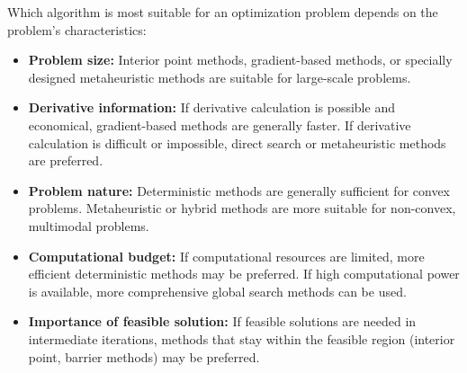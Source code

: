 \begin{tcolorbox}[title=Optimization Algorithm Selection]
Which algorithm is most suitable for an optimization problem depends on the problem's characteristics:

\begin{itemize}
    \item \textbf{Problem size:} Interior point methods, gradient-based methods, or specially designed metaheuristic methods are suitable for large-scale problems.
    
    \item \textbf{Derivative information:} If derivative calculation is possible and economical, gradient-based methods are generally faster. If derivative calculation is difficult or impossible, direct search or metaheuristic methods are preferred.
    
    \item \textbf{Problem nature:} Deterministic methods are generally sufficient for convex problems. Metaheuristic or hybrid methods are more suitable for non-convex, multimodal problems.
    
    \item \textbf{Computational budget:} If computational resources are limited, more efficient deterministic methods may be preferred. If high computational power is available, more comprehensive global search methods can be used.
    
    \item \textbf{Importance of feasible solution:} If feasible solutions are needed in intermediate iterations, methods that stay within the feasible region (interior point, barrier methods) may be preferred.
\end{itemize}
\end{tcolorbox} 